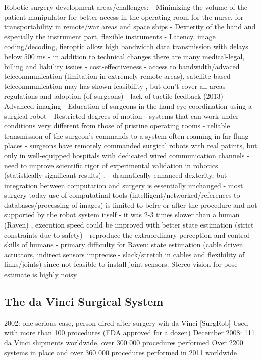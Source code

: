 Robotic surgery development areas/challenges:
- Minimizing the volume of the patient manipulator for better access in the operating room for the nurse, for transportability in remote/war areas and space ships
- Dexterity of the hand and especially the instrument part, flexible instruments
- Latency, image coding/decoding, fieroptic allow high bandwidth data transmission with delays below 500 ms
- in addition to technical changes there are many medical-legal, billing and liability issues
- cost-effectiveness
- access to bandwidth/advaced telecommunication (limitation in extremely remote areas), satellite-based telecommunication may has shown feasibility \citep{bib:telesurg_history}, but don't cover all areas \citep{bib:docatadist}
- regulations and adoption (of surgeons)
- lack of tactile feedback (2013)
- Advanced imaging
- Education of surgeons in the hand-eye-coordination using a surgical robot
- Restricted degrees of motion
- systems that can work under conditions very different from those of pristine operating rooms \citep{bib:docatadist}
- reliable transmission of the surgeon's commands to a system often roaming in far-flung places
- surgeons have remotely commanded surgical robots with real patints, but only in well-equipped hospitals with dedicated wired communication channels
- need to improve scientific rigor of experimental validation in robotics (statistically significant results) \citep{bib:raven_ii}.
- dramatically enhanced dexterity, but integration between computation and surgery is essentially unchanged \citep{bib:raven_ii}
- most surgery today use of computatinal tools (intelligent/networked/references to databases/processing of images) is limited to befre or after the procedure and not supported by the robot system itself \citep{bib:raven_ii}
- it was 2-3 times slower than a human (Raven) \citep{bib:raven_debride}, execution speed could be improved with better state estimation (strict constraints due to safety)
- reproduce the extraordinary perception and control skills of humans \citep{bib:raven_debride}
- primary difficulty for Raven: state estimation (cable driven actuators, indirect sensors imprecise - slack/stretch in cables and flexibility of links/joints) since not feasible to install joint sensors. Stereo vision for pose estimate is highly noisy \citep{bib:raven_debride}


\subsection{The da Vinci Surgical System}
2002: one serious case, person dired after surgery wih da Vinci [SurgRob]
Used with more than 100 procedures (FDA approved for a dozen)
December 2008: 111 da Vinci shipments worldwide, over 300 000 procedures performed
Over 2200 systems in place and over 360 000 procedures performed in 2011 worldwide \citep{bib:raven_ii}


